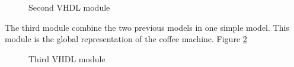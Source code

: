 \documentclass[12pt]{article}
\begin{document}
\begin{figure}[H]
\caption{Second VHDL module}
\label{fig:vhdl2}
\end{figure}

The third module combine the two previous models in one simple model. This module is the global representation of the coffee machine. Figure \ref{fig:vhdl3}



\begin{figure}[H]
\caption{Third VHDL module}
\label{fig:vhdl3}
\end{figure}
\end{document}
